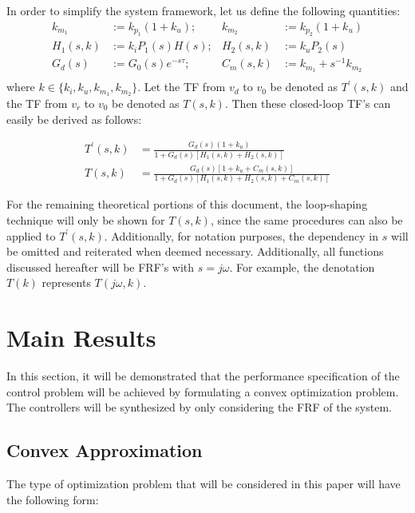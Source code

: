 \documentclass[a4paper, 10pt, conference]{ieeeconf}
\begin{document}
In order to simplify the system framework, let us define the following quantities:
\begin{equation} \label{eq:new_var}
\begin{aligned}
k_{m_1} &:= k_{p_1}(1+k_u) ;  &k_{m_2} &:= k_{p_2}(1+k_u)  \\
H_1(s,k) &:= k_iP_1(s)H(s);  &H_2(s,k) &:= k_uP_2(s) \\
G_d(s) &:= G_0(s)e^{-s\tau}; &C_m(s,k) &:= k_{m_1}+s^{-1}k_{m_2}\\ 
\end{aligned}
\end{equation}
where $k \in \{k_i,k_u,k_{m_1},k_{m_2}\}$. Let the TF from $v_d$ to $v_0$ be denoted as $T^{\prime}(s,k)$ and the TF from $v_r$ to $v_0$ be denoted as $T(s,k)$.  Then these closed-loop TF's can easily be derived as follows:

\begin{align}
T^{\prime}(s,k) &= \frac{G_d(s)(1+k_u)}{1+G_d(s)[H_1(s,k)+H_2(s,k)]} \label{eq:Tclp}  \\ 
T(s,k) &= \frac{G_d(s)[1+k_u+C_m(s,k)]}{1+G_d(s)[H_1(s,k)+H_2(s,k)+C_m(s,k)]}  \label{eq:Tcl} 
\end{align}

For the remaining theoretical portions of this document, the loop-shaping technique will only be shown for $T(s,k)$, since the same procedures can also be applied to $T^{\prime}(s,k)$. Additionally, for notation purposes, the dependency in $s$ will be omitted and reiterated when deemed necessary. Additionally, all functions discussed hereafter will be FRF's with $s = j\omega$. For example, the denotation $T(k)$ represents $T(j\omega,k)$.



\section{Main Results}
\label{sec:main}
In this section, it will be demonstrated that the performance specification of the control problem will be achieved by formulating a convex optimization problem. The controllers will be synthesized by only considering the FRF of the system.

\subsection{Convex Approximation}
The type of optimization problem that will be considered in this paper will have the following form:
\end{document}

